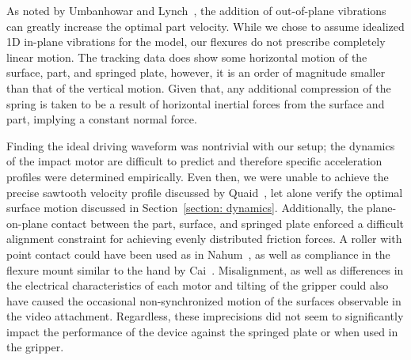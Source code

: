 As noted by Umbanhowar and Lynch~\cite{umbanhowar2008optimal}, the addition of out-of-plane vibrations can greatly increase the optimal part velocity.
%
While we chose to assume idealized 1D in-plane vibrations for the model, our flexures do not prescribe completely linear motion.
%
The tracking data does show some horizontal motion of the surface, part, and springed plate, however, it is an order of magnitude smaller than that of the vertical motion.
%
Given that, any additional compression of the spring is taken to be a result of horizontal inertial forces from the surface and part, implying a constant normal force.

Finding the ideal driving waveform was nontrivial with our setup; the dynamics of the impact motor are difficult to predict and therefore specific acceleration profiles were determined empirically.
%
Even then, we were unable to achieve the precise sawtooth velocity profile discussed by Quaid~\cite{quaid1999feeder}, let alone verify the optimal surface motion discussed in Section~\ref{section: dynamics}.
%
Additionally, the plane-on-plane contact between the part, surface, and springed plate enforced a difficult alignment constraint for achieving evenly distributed friction forces.
%
A roller with point contact could have been used as in Nahum~\cite{nahum2022robotic}, as well as compliance in the flexure mount similar to the hand by Cai~\cite{cai2023hand}.
%
Misalignment, as well as differences in the electrical characteristics of each motor and tilting of the gripper could also have caused the occasional non-synchronized motion of the surfaces observable in the video attachment.
%
Regardless, these imprecisions did not seem to significantly impact the performance of the device against the springed plate or when used in the gripper.
